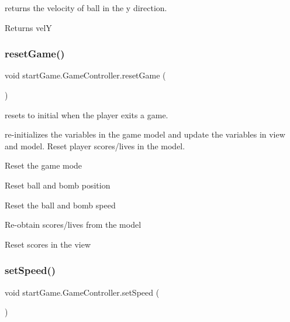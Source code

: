 returns the velocity of ball in the y direction. 

\begin{DoxyReturn}{Returns}
velY 
\end{DoxyReturn}
\hypertarget{classstart_game_1_1_game_controller_a2248f03e8a73083a57b10d4faec5797c}{}\label{classstart_game_1_1_game_controller_a2248f03e8a73083a57b10d4faec5797c} 
\subsubsection{\texorpdfstring{reset\+Game()}{resetGame()}}
{\footnotesize\ttfamily void start\+Game.\+Game\+Controller.\+reset\+Game (\begin{DoxyParamCaption}{ }\end{DoxyParamCaption})\hspace{0.3cm}{\ttfamily [private]}}



resets to initial when the player exits a game. 

re-\/initializes the variables in the game model and update the variables in view and model. Reset player scores/lives in the model.

Reset the game mode

Reset ball and bomb position

Reset the ball and bomb speed

Re-\/obtain scores/lives from the model

Reset scores in the view\hypertarget{classstart_game_1_1_game_controller_a115fe144ac38f1b8d7e6be4d5bbb23f4}{}\label{classstart_game_1_1_game_controller_a115fe144ac38f1b8d7e6be4d5bbb23f4} 
\subsubsection{\texorpdfstring{set\+Speed()}{setSpeed()}}
{\footnotesize\ttfamily void start\+Game.\+Game\+Controller.\+set\+Speed (\begin{DoxyParamCaption}{ }\end{DoxyParamCaption})\hspace{0.3cm}{\ttfamily [private]}}



